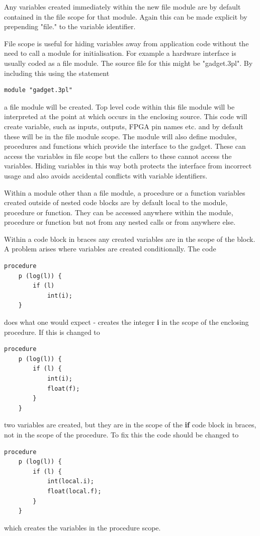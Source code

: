 \documentclass[10pt,a4paper,twoside,fleqn]{article}
\newcommand{\var}[1]{{\bf #1}} %
\begin{document}
    Any variables created immediately within the new file module are by default
    contained in the file scope for that module. Again this can be made explicit
    by prepending "file." to the variable identifier.
    
    File scope is useful for hiding variables away from application code without
    the need to call a module for initialisation. For example a hardware
    interface is usually coded as a file module. The source file for this might be
    "gadget.3pl". By including this using the statement
    \begin{lstlisting}[language=threepl]
        module "gadget.3pl"
    \end{lstlisting}
    a file module will be created. Top level code within this file module will
    be interpreted at the point at which occurs in the enclosing source. This
    code will create variable, such as inputs, outputs, FPGA pin names etc. and 
    by default these will be in the file module scope. The module will also
    define modules, procedures and functions which provide the interface to the
    gadget. These can access the variables in file scope but the callers to
    these cannot access the variables. Hiding variables in this way both
    protects the interface from incorrect usage and also avoids accidental
    conflicts with variable identifiers.
    
    Within a module other than a file module, a procedure or a function variables
    created outside of nested code blocks are by default local to the module,
    procedure or function. They can be accessed anywhere within the module,
    procedure or function but not from any nested calls or from anywhere else.
    
    Within a code block in braces any created variables are in the scope
    of the block. A problem arises where variables are created conditionally.
    The code
    \begin{lstlisting}[language=threepl]
    procedure
    p (log(l)) {
        if (l)
            int(i);
    }
    \end{lstlisting}
    does what one would expect - creates the integer \var{i} in the scope
    of the enclosing procedure. If this is changed to
    \begin{lstlisting}[language=threepl]
    procedure
    p (log(l)) {
        if (l) {
            int(i);
            float(f);
        }
    }
    \end{lstlisting}
    two variables are created, but they are in the scope of the {\bf if} code
    block in braces, not in the scope of the procedure. To fix this the code
    should be changed to
    \begin{lstlisting}[language=threepl]
    procedure
    p (log(l)) {
        if (l) {
            int(local.i);
            float(local.f);
        }
    }
    \end{lstlisting}
    which creates the variables in the procedure scope.
    
\end{document}
